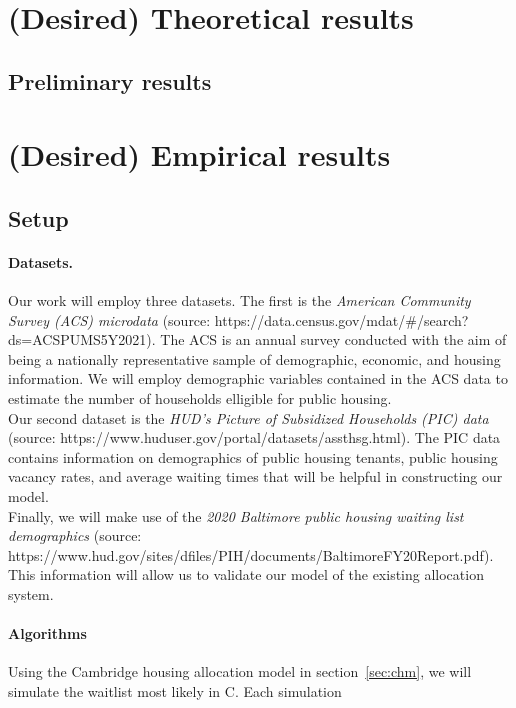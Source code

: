 \documentclass[11pt]{article}
\begin{document}
\section{(Desired) Theoretical results}


\subsection{Preliminary results}


\section{(Desired) Empirical results}

\subsection{Setup}
\paragraph{Datasets.}
Our work will employ three datasets. The first is the \textit{American Community Survey (ACS) microdata} (source: https://data.census.gov/mdat/\#/search?ds=ACSPUMS5Y2021). The ACS is an annual survey conducted with the aim of being a nationally representative sample of demographic, economic, and housing information. We will employ demographic variables contained in the ACS data to estimate the number of households elligible for public housing. \\
\newline
Our second dataset is the \textit{HUD’s Picture of Subsidized Households (PIC) data} (source: https://www.huduser.gov/portal/datasets/assthsg.html). The PIC data contains information on demographics of public housing tenants, public housing vacancy rates, and average waiting times that will be helpful in constructing our model. \\
\newline
Finally, we will make use of the \textit{2020 Baltimore public housing waiting list demographics} (source: https://www.hud.gov/sites/dfiles/PIH/documents/BaltimoreFY20Report.pdf). This information will allow us to validate our model of the existing allocation system.

\paragraph{Algorithms}

Using the Cambridge housing allocation model in section~\ref{sec:chm}, we will simulate the waitlist most likely in C. Each simulation 
\end{document}
